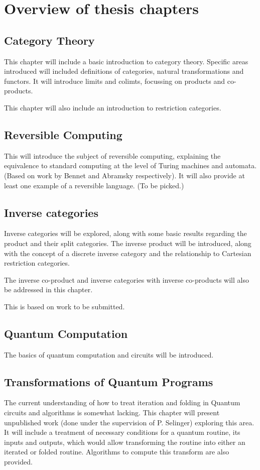 \chapter*{Overview of thesis chapters}

\section*{Category Theory}

This chapter will include a basic introduction to category theory. Specific areas introduced will 
included definitions of categories, natural transformations and functors. It will introduce limits
and colimts, focussing on products and co-products.

This chapter will also include an introduction to restriction categories.

\section*{Reversible Computing}

This will introduce the subject of reversible computing, explaining the equivalence to 
standard computing at the level of Turing machines and automata. (Based on work by Bennet and 
Abramsky respectively). It will also provide at least one example of a reversible language. (To be
picked.)

\section*{Inverse categories}

Inverse categories will be explored, along with some basic results regarding the product and
their split categories. The inverse product will be introduced, along with the concept of
a discrete inverse category and the relationship to Cartesian restriction categories. 

The inverse co-product and inverse categories with inverse co-products will also be addressed in
this chapter.

This is based on work to be submitted. 

\section*{Quantum Computation}
The basics of quantum computation and circuits will be introduced.

\section*{Transformations of Quantum Programs}
The current understanding of how to treat iteration and folding in Quantum circuits and 
algorithms is somewhat lacking. This chapter will present unpublished work (done under the
supervision of P. Selinger) exploring this area. It will include a treatment of necessary 
conditions for a quantum routine, its inputs and outputs, which would allow transforming
the routine into either an iterated or folded routine. Algorithms to compute this transform
are also provided.

